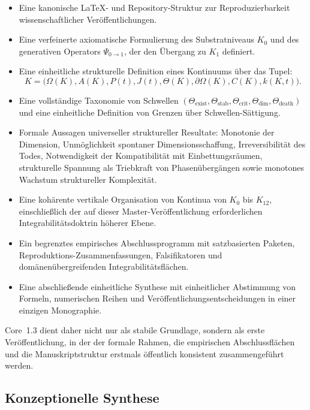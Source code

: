 \begin{itemize}
    \item Eine kanonische \LaTeX{}- und Repository-Struktur zur Reproduzierbarkeit
          wissenschaftlicher Veröffentlichungen.
    \item Eine verfeinerte axiomatische Formulierung des Substratniveaus
          \(K_0\) und des generativen Operators
          \(\Psi_{0\to 1}\), der den Übergang zu \(K_1\) definiert.
    \item Eine einheitliche strukturelle Definition eines Kontinuums über das
          Tupel:
          \[
              K = \big(\Omega(K), A(K), P(t), J(t), \Theta(K), \partial\Omega(K), C(K), k(K,t)\big).
          \]
    \item Eine vollständige Taxonomie von Schwellen
          \((\Theta_{\mathrm{exist}}, \Theta_{\mathrm{stab}}, \Theta_{\mathrm{crit}},
            \Theta_{\mathrm{dim}}, \Theta_{\mathrm{death}})\)
          und eine einheitliche Definition von Grenzen über Schwellen-Sättigung.
    \item Formale Aussagen universeller struktureller Resultate:
          Monotonie der Dimension,
          Unmöglichkeit spontaner Dimensionsschaffung,
          Irreversibilität des Todes,
          Notwendigkeit der Kompatibilität mit Einbettungsräumen,
          strukturelle Spannung als Triebkraft von Phasenübergängen
          sowie monotones Wachstum struktureller Komplexität.
    \item Eine kohärente vertikale Organisation von Kontinua von \(K_0\) bis
          \(K_{12}\), einschließlich der auf dieser Master-Veröffentlichung
          erforderlichen Integrabilitätsdoktrin höherer Ebene.
    \item Ein begrenztes empirisches Abschlussprogramm mit satzbasierten
          Paketen, Reproduktions-Zusammenfassungen, Falsifikatoren und
          domänenübergreifenden Integrabilitätsflächen.
    \item Eine abschließende einheitliche Synthese mit einheitlicher Abstimmung von
          Formeln, numerischen Reihen und Veröffentlichungsentscheidungen in einer
          einzigen Monographie.
\end{itemize}

Core~1.3 dient daher nicht nur als stabile Grundlage, sondern als erste
Veröffentlichung, in der der formale Rahmen, die empirischen Abschlussflächen und
die Manuskriptstruktur erstmals öffentlich konsistent zusammengeführt werden.

\subsection{Konzeptionelle Synthese}

